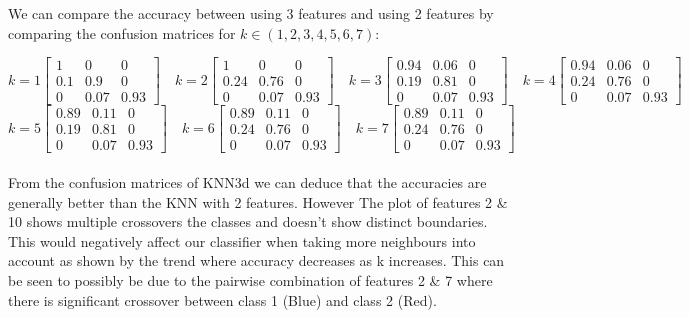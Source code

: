\documentclass[10pt]{article}
\begin{document}
\noindent
We can compare the accuracy between using 3 features and using 2 features by comparing the confusion matrices for $k \in (1,2,3,4,5,6,7)$:

$$
k=1
\begin{bmatrix} 
1 & 0 & 0\\
0.1 & 0.9 & 0\\
0 & 0.07 & 0.93
\end{bmatrix}
\quad
k=2
\begin{bmatrix} 
1 & 0 & 0\\
0.24 & 0.76 & 0\\
0 & 0.07 & 0.93
\end{bmatrix}
\quad
k=3
\begin{bmatrix} 
0.94 & 0.06 & 0\\
0.19 & 0.81 & 0\\
0 & 0.07 & 0.93
\end{bmatrix}
\quad
k=4
\begin{bmatrix} 
0.94 & 0.06 & 0\\
0.24 & 0.76 & 0\\
0 & 0.07 & 0.93
\end{bmatrix}
$$
$$
k=5
\begin{bmatrix} 
0.89 & 0.11 & 0\\
0.19 & 0.81 & 0\\
0 & 0.07 & 0.93
\end{bmatrix}
\quad
k=6
\begin{bmatrix} 
0.89 & 0.11 & 0\\
0.24 & 0.76 & 0\\
0 & 0.07 & 0.93
\end{bmatrix}
\quad
k=7
\begin{bmatrix} 
0.89 & 0.11 & 0\\
0.24 & 0.76 & 0\\
0 & 0.07 & 0.93
\end{bmatrix}
\quad
$$
\noindent
\\
\noindent
From the confusion matrices of KNN3d we can deduce that the accuracies are generally better than the KNN with 2 features. However  The plot of features 2 \& 10 shows multiple crossovers the classes and doesn’t show distinct boundaries. This would negatively affect our classifier when taking more neighbours into account as shown by the trend where accuracy decreases as k increases. This can be seen to possibly be due to the pairwise combination of features 2 \& 7 where there is significant crossover between class 1 (Blue) and class 2 (Red).
\end{document}
